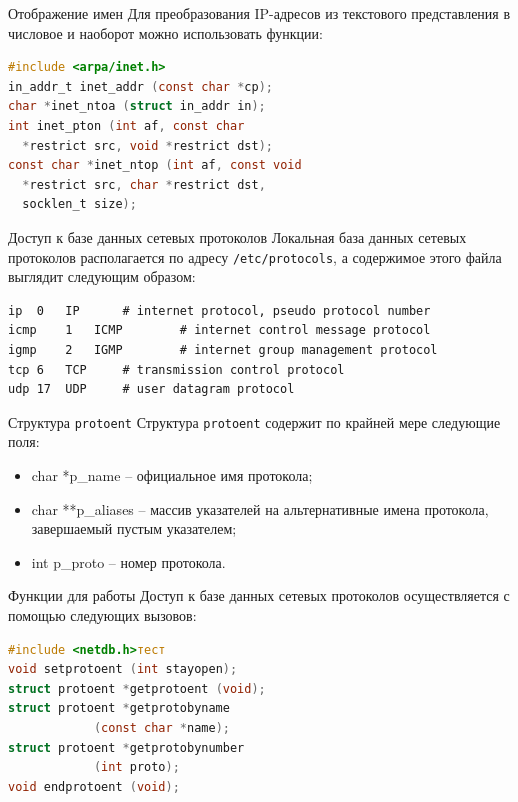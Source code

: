 \begin{frame}[fragile]{Отображение имен}
Для преобразования IP-адресов из текстового представления в числовое и наоборот можно использовать функции:
\scriptsize\begin{lstlisting}[language=C]
#include <arpa/inet.h>
in_addr_t inet_addr (const char *cp);
char *inet_ntoa (struct in_addr in);
int inet_pton (int af, const char 
  *restrict src, void *restrict dst);
const char *inet_ntop (int af, const void 
  *restrict src, char *restrict dst, 
  socklen_t size);
\end{lstlisting}
\end{frame}

\begin{frame}[fragile]{Доступ к базе данных сетевых протоколов}
Локальная база данных сетевых протоколов располагается по адресу {\tt /etc/protocols}, а содержимое этого файла выглядит следующим образом:
\scriptsize\begin{verbatim}
ip	0	IP		# internet protocol, pseudo protocol number
icmp	1	ICMP		# internet control message protocol
igmp	2	IGMP		# internet group management protocol
tcp	6	TCP		# transmission control protocol
udp	17	UDP		# user datagram protocol
\end{verbatim}
\end{frame}

\begin{frame}[fragile]{Структура {\tt protoent}}
Структура {\tt protoent} содержит по крайней мере следующие поля:
\begin{itemize}
	\item char  *p\_name -- официальное имя протокола;
	\item char **p\_aliases -- массив указателей на альтернативные имена протокола, завершаемый пустым указателем;
	\item int    p\_proto -- номер протокола.
\end{itemize}
\end{frame}

\begin{frame}[fragile]{Функции для работы}
Доступ к базе данных сетевых протоколов осуществляется с помощью следующих вызовов:
\scriptsize\begin{lstlisting}[language=C]
#include <netdb.h>тест
void setprotoent (int stayopen);
struct protoent *getprotoent (void);
struct protoent *getprotobyname 
            (const char *name);
struct protoent *getprotobynumber
			(int proto);
void endprotoent (void);
\end{lstlisting}
\end{frame}

